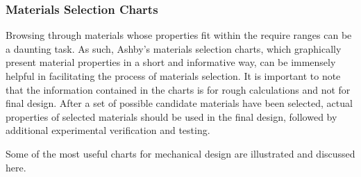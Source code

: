 \documentclass[a4paper,openany,nobib]{tufte-book}
\begin{document}
\subsubsection{Materials Selection Charts}
\label{materials-selection-charts}
Browsing through materials whose properties fit within the require
ranges can be a daunting task. As such, Ashby's materials selection
charts, which graphically present material properties in a short and
informative way, can be immensely helpful in facilitating the process of
materials selection. It is important to note that the information
contained in the charts is for rough calculations and not for final
design. After a set of possible candidate materials have been selected,
actual properties of selected materials should be used in the final
design, followed by additional experimental verification and testing.

Some of the most useful charts for mechanical design are illustrated and
discussed here.
\end{document}
